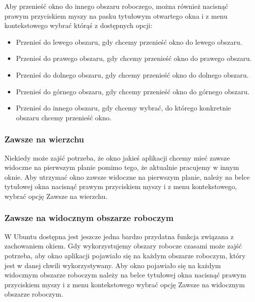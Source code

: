 Aby przenieść okno do innego obszaru roboczego, można również nacisnąć prawym przyciskiem myszy na pasku tytułowym otwartego okna i z menu kontekstowego wybrać którąś z dostępnych opcji:
\begin{itemize}
\item \textcolor{ubuntu_orange}{Przenieś do lewego obszaru}, gdy chcemy przenieść okno do lewego obszaru.
\item \textcolor{ubuntu_orange}{Przenieś do prawego obszaru}, gdy chcemy przenieść okno do prawego obszaru.
\item \textcolor{ubuntu_orange}{Przenieś do dolnego obszaru}, gdy chcemy przenieść okno do dolnego obszaru.
\item \textcolor{ubuntu_orange}{Przenieś do górnego obszaru}, gdy chcemy przenieść okno do górnego obszaru.
\item \textcolor{ubuntu_orange}{Przenieś do innego obszaru}, gdy chcemy wybrać, do którego konkretnie obszaru chcemy przenieść okno.
\end{itemize}

\subsubsection{Zawsze na wierzchu}
Niekiedy może zajść potrzeba, że okno jakieś aplikacji chcemy mieć zawsze widoczne na pierwszym planie pomimo tego, że aktualnie pracujemy w innym oknie. Aby utrzymać okno zawsze widoczne na pierwszym planie, należy na belce tytułowej okna nacisnąć prawym przyciskiem myszy i z menu kontekstowego, wybrać opcję \textcolor{ubuntu_orange}{Zawsze na wierzchu}.

\subsubsection{Zawsze na widocznym obszarze roboczym}
W Ubuntu dostępna jest jeszcze jedna bardzo przydatna funkcja związana z zachowaniem okiem. Gdy wykorzystujemy obszary robocze czasami może zajść potrzeba, aby okno aplikacji pojawiało się na każdym obszarze roboczym, który jest w danej chwili wykorzystywany. Aby okno pojawiało się na każdym widocznym obszarze roboczym należy na belce tytułowej okna nacisnąć prawym przyciskiem myszy i z menu kontekstowego wybrać opcję \textcolor{ubuntu_orange}{Zawsze na widocznym obszarze roboczym}.
